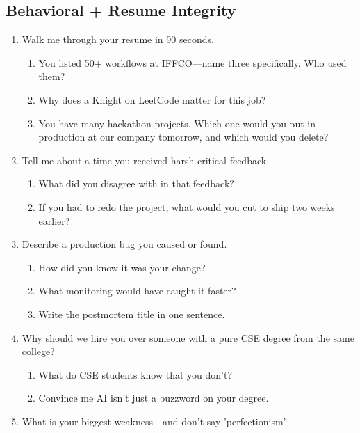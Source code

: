 \documentclass[9pt,a4paper]{article}
\begin{document}
\subsection{Behavioral + Resume Integrity}
\begin{enumerate}[label=\textbf{Q\arabic*:}, leftmargin=*]
  \item Walk me through your resume in 90 seconds.
  \begin{enumerate}[label=\textit{FU\arabic*:}, leftmargin=2em]
    \item You listed 50+ workflows at IFFCO---name three specifically. Who used them?
    \item Why does a Knight on LeetCode matter for this job?
    \item You have many hackathon projects. Which one would you put in production at our company tomorrow, and which would you delete?
  \end{enumerate}
  \item Tell me about a time you received harsh critical feedback.
  \begin{enumerate}[label=\textit{FU\arabic*:}, leftmargin=2em]
    \item What did you disagree with in that feedback?
    \item If you had to redo the project, what would you cut to ship two weeks earlier?
  \end{enumerate}
  \item Describe a production bug you caused or found.
  \begin{enumerate}[label=\textit{FU\arabic*:}, leftmargin=2em]
    \item How did you know it was your change?
    \item What monitoring would have caught it faster?
    \item Write the postmortem title in one sentence.
  \end{enumerate}
  \item Why should we hire you over someone with a pure CSE degree from the same college?
  \begin{enumerate}[label=\textit{FU\arabic*:}, leftmargin=2em]
    \item What do CSE students know that you don't?
    \item Convince me AI isn't just a buzzword on your degree.
  \end{enumerate}
  \item What is your biggest weakness---and don't say 'perfectionism'.
  \begin{enumerate}[label=\textit{FU\arabic*:}, leftmargin=2em]

\end{enumerate}
\end{enumerate}
\end{document}
